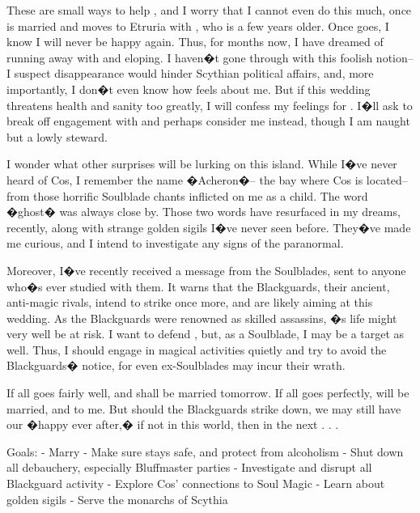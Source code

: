 \documentclass[char]{Kos}
\begin{document}
These are small ways to help \cBride{\nickname}, and I worry that I cannot even do this much, once \cBride{\they} is married and moves to Etruria with \cGroom{\nickname}, who is a few years older. Once \cBride{\they} goes, I know I will never be happy again. Thus, for months now, I have dreamed of running away with \cBride{\nickname} and eloping. I haven�t gone through with this foolish notion-- I suspect \cBride{\their} disappearance would hinder Scythian political affairs, and, more importantly, I don�t even know how \cBride{\nickname} feels about me. But if this wedding threatens \cBride{\their} health and sanity too greatly, I will confess my feelings for \cBride{\them}. I�ll ask \cBride{\them} to break off \cBride{\their} engagement with \cGroom{\nickname} and perhaps consider me instead, though I am naught but a lowly steward. 

I wonder what other surprises will be lurking on this island. While I�ve never heard of Cos, I remember the name �Acheron�-- the bay where Cos is located-- from those horrific Soulblade chants inflicted on me as a child. The word �ghost� was always close by. Those two words have resurfaced in my dreams, recently, along with strange golden sigils I�ve never seen before. They�ve made me curious, and I intend to investigate any signs of the paranormal.

Moreover, I�ve recently received a message from the Soulblades, sent to anyone who�s ever studied with them. It warns that the Blackguards, their ancient, anti-magic rivals, intend to strike once more, and are likely aiming at this wedding. As the Blackguards were renowned as skilled assassins, \cBride{\nickname}�s life might very well be at risk. I want to defend \cBride{\them}, but, as a Soulblade, I may be a target as well. Thus, I should engage in magical activities quietly and try to avoid the Blackguards� notice, for even ex-Soulblades may incur their wrath.

If all goes fairly well, \cBride{\nickname} and \cGroom{\nickname} shall be married tomorrow. If all goes perfectly, \cBride{\nickname} will be married, and to me. But should the Blackguards strike \cBride{\them} down, we may still have our �happy ever after,� if not in this world, then in the next . . .

Goals:
- Marry \cBride{\nickname}
- Make sure \cBride{\nickname} stays safe, and protect \cBride{\them} from alcoholism
- Shut down all debauchery, especially Bluffmaster parties
- Investigate and disrupt all Blackguard activity
- Explore Cos' connections to Soul Magic
- Learn about golden sigils
- Serve the monarchs of Scythia
\end{document}
